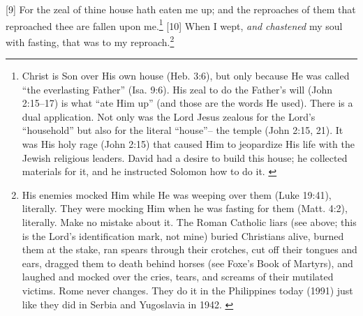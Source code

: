 [9] \textcolor[rgb]{0.00,0.00,1.00}{For the zeal of thine house hath eaten me up; and the reproaches of them that reproached thee are fallen upon me.}\footnote{Christ is Son over His own house (Heb. 3:6), but only because He was called “the everlasting Father” (Isa. 9:6). His zeal to do the Father’s will (John 2:15--17) is what “ate Him up” (and those are the words He used). There is a dual application. Not only was the Lord Jesus zealous for the Lord’s “household” but also for the literal “house”-- the temple (John 2:15, 21). It was His holy rage (John 2:15) that caused Him to jeopardize His life with the Jewish religious leaders. David had a desire to build this house; he collected materials for it, and he instructed Solomon how to do it. \cite{Ruckman1992Psalms}  }
[10] \textcolor[rgb]{0.00,0.00,1.00}{When I wept, \emph{and} \emph{chastened} my soul with fasting, that was to my reproach.}\footnote{His enemies mocked Him while He was weeping over them (Luke 19:41), literally. They were mocking Him when he was fasting for them (Matt. 4:2), literally. Make no mistake about it. The Roman Catholic liars (see above; this is the Lord’s identification mark, not mine) buried Christians alive, burned them at the stake, ran spears through their crotches, cut off their tongues and ears, dragged them to death behind horses (see Foxe’s Book of Martyrs), and laughed and mocked over the cries, tears, and screams of their mutilated victims. Rome never changes. They do it in the Philippines today (1991) just like they did in Serbia and Yugoslavia in 1942. \cite{Ruckman1992Psalms}  }
